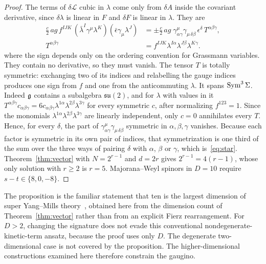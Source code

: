 \begin{proof}
The terms of $\delta\mathcal L$ cubic in $\lambda$ come only from $\delta A$ inside the covariant derivative, since $\delta\lambda$ is linear in $F$ and $\delta F$ is linear in $\lambda$. They are
\begin{equation}
\label{eq:cubic}
\begin{aligned}\tfrac{c}{2}\,ag\,f^{IJK}\,(\bar\lambda^I\gamma^\mu\lambda^K)(\bar\epsilon\gamma_\mu\lambda^J)&=\pm\tfrac{c}{2}\,ag\;\gamma^\mu_{\alpha\gamma}\gamma_{\mu\,\delta\beta}\,\epsilon^\delta\,T^{\alpha\beta\gamma},\\ T^{\alpha\beta\gamma}&=f^{IJK}\lambda^{I\alpha}\lambda^{J\beta}\lambda^{K\gamma}.\end{aligned}
\end{equation}
where the sign depends only on the ordering convention for Grassmann variables. They contain no derivative, so they must vanish. The tensor $T$ is totally symmetric: exchanging two of its indices and relabelling the gauge indices produces one sign from $f$ and one from the anticommuting $\lambda$. It spans $\operatorname{Sym}^3\Sigma$. Indeed $\mathfrak{g}$ contains a subalgebra $\mathfrak{su}(2)$, and for $\lambda$ with values in it $T^{\alpha\beta\gamma}c_{\alpha\beta\gamma}=6c_{\alpha\beta\gamma}\lambda^{1\alpha}\lambda^{2\beta}\lambda^{3\gamma}$ for every symmetric $c$, after normalizing $f^{123}=1$. Since the monomials $\lambda^{1\alpha}\lambda^{2\beta}\lambda^{3\gamma}$ are linearly independent, only $c=0$ annihilates every $T$. Hence, for every $\delta$, the part of $\gamma^\mu_{\alpha\gamma}\gamma_{\mu\,\delta\beta}$ symmetric in $\alpha,\beta,\gamma$ vanishes. Because each factor is symmetric in its own pair of indices, that symmetrization is one third of the sum over the three ways of pairing $\delta$ with $\alpha$, $\beta$ or $\gamma$, which is~\eqref{eq:star}. Theorem~\ref{thm:vector} with $N=2^{r-1}$ and $d=2r$ gives $2^{r-1}=4(r-1)$, whose only solution with $r\ge2$ is $r=5$. Majorana--Weyl spinors in $D=10$ require $s-t\in\{8,0,-8\}$.
\end{proof}

The proposition is the familiar statement that ten is the largest dimension of super Yang--Mills theory~\cite{BrinkSchwarzScherk1977}, obtained here from the dimension count of Theorem~\ref{thm:vector} rather than from an explicit Fierz rearrangement. For $D>2$, changing the signature does not evade this conventional nondegenerate-kinetic-term ansatz, because the proof uses only $D$. The degenerate two-dimensional case is not covered by the proposition. The higher-dimensional constructions examined here therefore constrain the gaugino.

